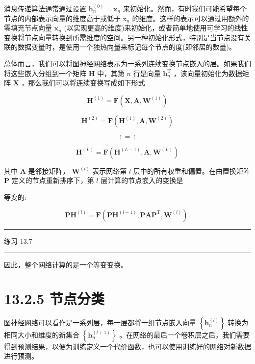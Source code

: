 \documentclass[10pt]{report}
\newcommand{\HRule}{\begin{center}\rule{0.9\linewidth}{0.2mm}\end{center}}
\begin{document}
消息传递算法通常通过设置 \({\mathbf{h}}_{n}^{\left( 0\right) } = {\mathbf{x}}_{n}\) 来初始化。然而，有时我们可能希望每个节点的内部表示向量的维度高于或低于 \({\mathrm{x}}_{n}\) 的维度。这样的表示可以通过用额外的零填充节点向量 \({\mathbf{x}}_{n}\) (以实现更高的维度)来初始化，或者简单地使用可学习的线性变换将节点向量转换到所需维度的空间。另一种初始化形式，特别是当节点没有关联的数据变量时，是使用一个独热向量来标记每个节点的度(即邻居的数量)。

总体而言，我们可以将图神经网络表示为一系列连续变换节点嵌入的层。如果我们将这些嵌入分组到一个矩阵 \(\mathbf{H}\) 中，其第 \(n\) 行是向量 \({\mathbf{h}}_{n}^{\mathrm{T}}\) ，该向量初始化为数据矩阵 \(\mathbf{X}\) ，那么我们可以将连续变换写成如下形式

\[
{\mathbf{H}}^{\left( 1\right) } = \mathbf{F}\left( {\mathbf{X},\mathbf{A},{\mathbf{W}}^{\left( 1\right) }}\right)
\]

\[
{\mathbf{H}}^{\left( 2\right) } = \mathbf{F}\left( {{\mathbf{H}}^{\left( 1\right) },\mathbf{A},{\mathbf{W}}^{\left( 2\right) }}\right)
\]

\[
\vdots \; = \;\vdots
\]

\[
{\mathbf{H}}^{\left( L\right) } = \mathbf{F}\left( {{\mathbf{H}}^{\left( L - 1\right) },\mathbf{A},{\mathbf{W}}^{\left( L\right) }}\right)  \tag{13.18}
\]

其中 \(\mathbf{A}\) 是邻接矩阵， \({\mathbf{W}}^{\left( l\right) }\) 表示网络第 \(l\) 层中的所有权重和偏置。在由置换矩阵 \(\mathbf{P}\) 定义的节点重新排序下，第 \(l\) 层计算的节点嵌入的变换是

等变的:

\[
{\mathbf{{PH}}}^{\left( l\right) } = \mathbf{F}\left( {{\mathbf{{PH}}}^{\left( l - 1\right) },{\mathbf{{PAP}}}^{\mathrm{T}},{\mathbf{W}}^{\left( l\right) }}\right) . \tag{13.19}
\]

\HRule

练习 13.7

\HRule

因此，整个网络计算的是一个等变变换。

\section*{13.2.5 节点分类}

图神经网络可以看作是一系列层，每一层都将一组节点嵌入向量 \(\left\{  {\mathbf{h}}_{n}^{\left( l\right) }\right\}\) 转换为相同大小和维度的新集合 \(\left\{  {\mathbf{h}}_{n}^{\left( l + 1\right) }\right\}\) 。在网络的最后一个卷积层之后，我们需要得到预测结果，以便为训练定义一个代价函数，也可以使用训练好的网络对新数据进行预测。
\end{document}
